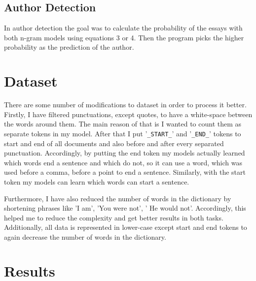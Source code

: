 \documentclass{article}
\begin{document}
\subsection{Author Detection}

In author detection the goal was to calculate the probability of the essays with both n-gram models using equations 3 or 4. Then the program picks the higher probability as the prediction of the author.
\section{Dataset}

There are some number of modifications to dataset in order to process it better. Firstly, I have filtered punctuations, except quotes, to have a white-space between the words around them. The main reason of that is I wanted to count them as separate tokens in my model. After that I put '\texttt{\_START\_}' and '\texttt{\_END\_}' tokens to start and end of all documents and also before and after every separated punctuation. Accordingly, by putting the end token my models actually learned which words end a sentence and which do not, so it can use a word, which was used before a comma, before a point to end a sentence. Similarly, with the start token my models can learn which words can start a sentence.

Furthermore, I have also reduced the number of words in the dictionary by shortening phrases like 'I am', 'You were not', ' He would not'. Accordingly, this helped me to reduce the complexity and get better results in both tasks. Additionally, all data is represented in lower-case except start and end tokens to again decrease the number of words in the dictionary.

\section{Results}



\end{document}
